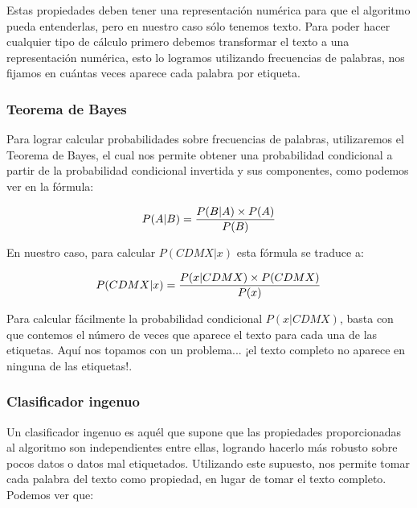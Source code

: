 Estas propiedades deben tener una representación numérica para que el algoritmo pueda entenderlas, pero en nuestro caso sólo tenemos texto. Para poder hacer cualquier tipo de cálculo primero debemos transformar el texto a una representación numérica, esto lo logramos utilizando frecuencias de palabras, nos fijamos en cuántas veces aparece cada palabra por etiqueta.

\subsubsection{Teorema de Bayes}

Para lograr calcular probabilidades sobre frecuencias de palabras, utilizaremos el Teorema de Bayes, el cual nos permite obtener una probabilidad condicional a partir de la probabilidad condicional invertida y sus componentes, como podemos ver en la fórmula:

\[ P( A | B ) = {{P( B | A ) \times P(A)} \over P(B)} \]

En nuestro caso, para calcular \(P( CDMX | x )\) esta fórmula se traduce a:

\[ P( CDMX | x ) = {{P( x | CDMX ) \times P(CDMX)} \over P(x)} \]





Para calcular fácilmente la probabilidad condicional \(P(x | CDMX)\), basta con que contemos el número de veces que aparece el texto  para cada una de las etiquetas. Aquí nos topamos con un problema... ¡el texto completo no aparece en ninguna de las etiquetas!.

\subsubsection{Clasificador ingenuo}

Un clasificador ingenuo es aquél que supone que las propiedades proporcionadas al algoritmo son independientes entre ellas, logrando hacerlo más robusto sobre pocos datos o datos mal etiquetados.
Utilizando este supuesto, nos permite tomar cada palabra del texto como propiedad, en lugar de tomar el texto completo. Podemos ver que: 

